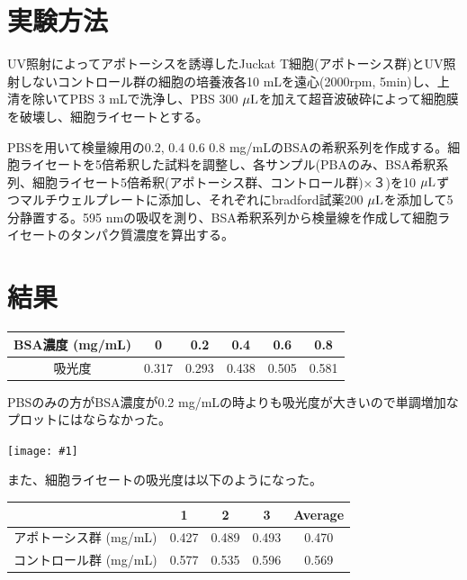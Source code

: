 \documentclass[a4paper,papersize,dvipdfmx]{jsarticle}
\newcommand{\pict}[2]{\begin{center} \texttt{[image: \#1]} \end{center}}   %
\begin{document}
\section*{実験方法}
UV照射によってアポトーシスを誘導したJuckat T細胞(アポトーシス群)とUV照射しないコントロール群の細胞の培養液各10 mLを遠心(2000rpm, 5min)し、上清を除いてPBS 3 mLで洗浄し、PBS 300 $\rm \mu L$を加えて超音波破砕によって細胞膜を破壊し、細胞ライセートとする。

PBSを用いて検量線用の0.2, 0.4 0.6 0.8 mg/mLのBSAの希釈系列を作成する。細胞ライセートを5倍希釈した試料を調整し、各サンプル(PBAのみ、BSA希釈系列、細胞ライセート5倍希釈(アポトーシス群、コントロール群)×３)を10 $\rm \mu L$ずつマルチウェルプレートに添加し、それぞれにbradford試薬200 $\rm \mu L$を添加して5分静置する。595 nmの吸収を測り、BSA希釈系列から検量線を作成して細胞ライセートのタンパク質濃度を算出する。

\section*{結果}

\begin{table}[H]
\begin{center}
\begin{tabular}{|c|c|c|c|c|c|}
\hline
BSA濃度 (mg/mL) & 0     & 0.2   & 0.4   & 0.6   & 0.8   \\ \hline
吸光度 & 0.317 & 0.293 & 0.438 & 0.505 & 0.581 \\ \hline
\end{tabular}
\end{center}
\end{table}

PBSのみの方がBSA濃度が0.2 mg/mLの時よりも吸光度が大きいので単調増加なプロットにはならなかった。

\pict{imgs/day4.png}{11}

また、細胞ライセートの吸光度は以下のようになった。

\begin{table}[H]
\begin{center}
\begin{tabular}{|c|c|c|c|c|}
\hline
 & 1 & 2 & 3 & Average \\ \hline
アポトーシス群 (mg/mL) & 0.427 & 0.489 & 0.493 & 0.470 \\ \hline
コントロール群  (mg/mL) & 0.577 & 0.535 & 0.596 & 0.569 \\ \hline
\end{tabular}
\end{center}
\end{table}
\end{document}
